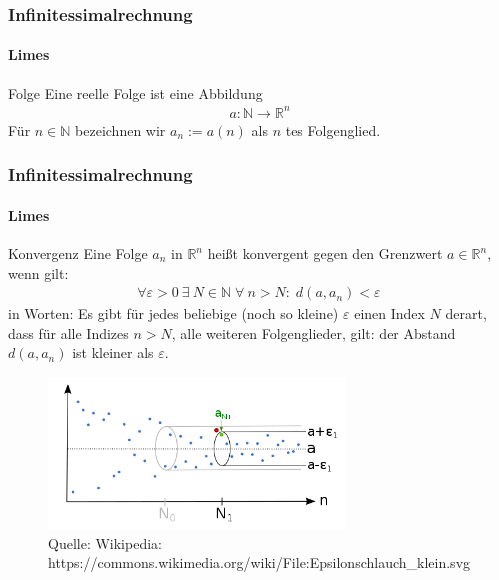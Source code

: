 \documentclass{beamer}
\begin{document}
\begin{frame}
    \frametitle{Infinitessimalrechnung}
\framesubtitle{Limes}

\begin{block}{Folge}
    Eine reelle Folge ist eine Abbildung
    \begin{align*}
    a: \mathbb{N} \rightarrow \mathbb{R}^n
    \end{align*}
 Für $n \in \mathbb{N}$ bezeichnen wir $a_n := a(n)$ als $n$ tes Folgenglied.
\end{block}


 \end{frame}



 \begin{frame}
    \frametitle{Infinitessimalrechnung}
\framesubtitle{Limes}

\begin{block}{Konvergenz}
    Eine Folge $a_n$ in $\mathbb{R}^n$ heißt konvergent gegen den Grenzwert $a \in \mathbb{R}^n$, wenn gilt:
    \begin{align*}
    \forall {\varepsilon > 0} \ \exists \ N \in \mathbb{N} \; \forall \ n > N: \; d(a, a_n) < \varepsilon\,
    \end{align*}
    in Worten: Es gibt für jedes beliebige (noch so kleine) $\varepsilon$ einen Index $N$ derart, dass für alle Indizes $n > N$, alle weiteren Folgenglieder, gilt: der Abstand $d(a, a_n)$ ist kleiner als $\varepsilon$.
    \end{block}


\begin{figure}[H]
      \centering
    \includegraphics[width=0.7\textwidth]{images/500px-Epsilonschlauch_klein}
      \caption{Quelle: Wikipedia: https://commons.wikimedia.org/wiki/File:Epsilonschlauch\_klein.svg}
\end{figure}

 \end{frame}
\end{document}
